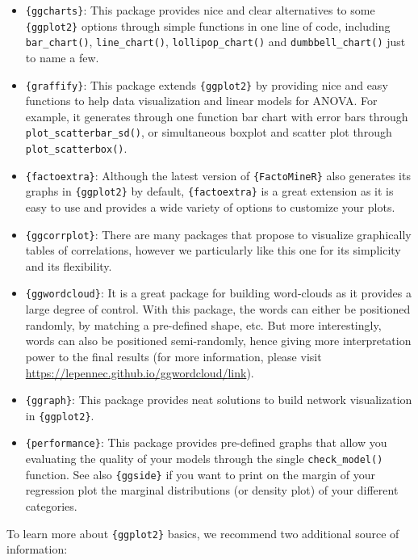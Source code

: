 \documentclass[
]{book}
\providecommand{\tightlist}{%
  \setlength{\itemsep}{0pt}\setlength{\parskip}{0pt}}
\begin{document}
\begin{itemize}
\tightlist
\item
  \texttt{\{ggcharts\}}: This package provides nice and clear alternatives to some \texttt{\{ggplot2\}} options through simple functions in one line of code, including \texttt{bar\_chart()}, \texttt{line\_chart()}, \texttt{lollipop\_chart()} and \texttt{dumbbell\_chart()} just to name a few.
\item
  \texttt{\{graffify\}}: This package extends \texttt{\{ggplot2\}} by providing nice and easy functions to help data visualization and linear models for ANOVA. For example, it generates through one function bar chart with error bars through \texttt{plot\_scatterbar\_sd()}, or simultaneous boxplot and scatter plot through \texttt{plot\_scatterbox()}.
\item
  \texttt{\{factoextra\}}: Although the latest version of \texttt{\{FactoMineR\}} also generates its graphs in \texttt{\{ggplot2\}} by default, \texttt{\{factoextra\}} is a great extension as it is easy to use and provides a wide variety of options to customize your plots.
\item
  \texttt{\{ggcorrplot\}}: There are many packages that propose to visualize graphically tables of correlations, however we particularly like this one for its simplicity and its flexibility.
\item
  \texttt{\{ggwordcloud\}}: It is a great package for building word-clouds as it provides a large degree of control. With this package, the words can either be positioned randomly, by matching a pre-defined shape, etc. But more interestingly, words can also be positioned semi-randomly, hence giving more interpretation power to the final results (for more information, please visit \url{https://lepennec.github.io/ggwordcloud/}\href{https://lepennec.github.io/ggwordcloud/}{link}).
\item
  \texttt{\{ggraph\}}: This package provides neat solutions to build network visualization in \texttt{\{ggplot2\}}.
\item
  \texttt{\{performance\}}: This package provides pre-defined graphs that allow you evaluating the quality of your models through the single \texttt{check\_model()} function. See also \texttt{\{ggside\}} if you want to print on the margin of your regression plot the marginal distributions (or density plot) of your different categories.
\end{itemize}

To learn more about \texttt{\{ggplot2\}} basics, we recommend two additional source of information:
\end{document}
